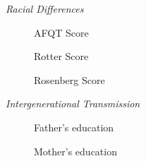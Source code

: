 \begin{frame}\begin{center}
\LARGE\textit{Racial Differences}
\end{center}\end{frame}
\begin{frame}\begin{figure}[htp]\centering
\caption{AFQT Score}
\end{figure}\end{frame}
\begin{frame}\begin{figure}[htp]\centering
\caption{Rotter Score}
\end{figure}\end{frame}
\begin{frame}\begin{figure}[htp]\centering
\caption{Rosenberg Score}
\end{figure}\end{frame}
\begin{frame}\begin{center}
\LARGE\textit{Intergenerational Transmission}
\end{center}\end{frame}
\begin{frame}\begin{figure}[htp]\centering
\caption{Father's education}
\end{figure}\end{frame}
\begin{frame}\begin{figure}[htp]\centering
\caption{Mother's education}
\end{figure}\end{frame}
